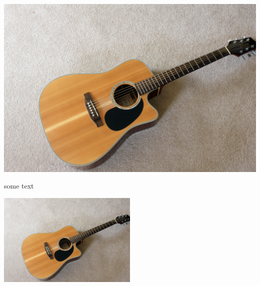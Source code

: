 \documentclass{article}
\begin{document}
\begin{center}
	\includegraphics[height = 0.5\textheight]{guitar.jpg}
\end{center}
some text
\begin{center}
	\includegraphics[width=0.5\textwidth]{guitar.jpg}
\end{center}
\end{document}
